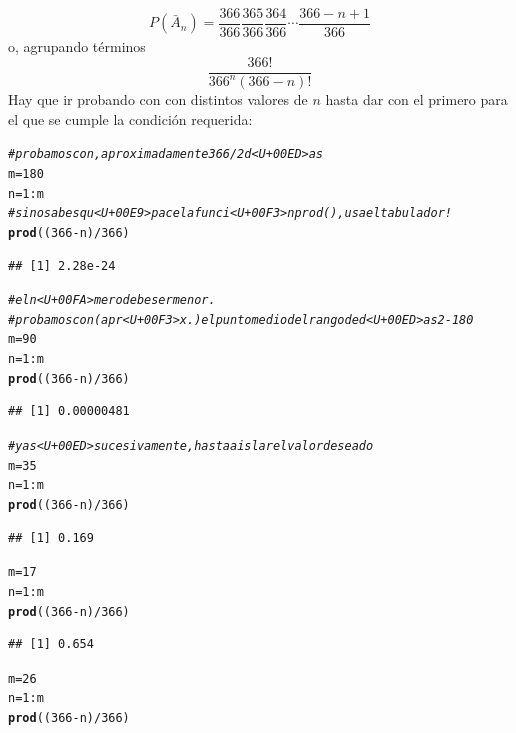 \documentclass[10pt,a4paper]{article}\usepackage[]{graphicx}\usepackage[]{color}
\makeatletter
\newcommand{\hlnum}[1]{\textcolor[rgb]{0.686,0.059,0.569}{#1}}%
\newcommand{\hlcom}[1]{\textcolor[rgb]{0.678,0.584,0.686}{\textit{#1}}}%
\newcommand{\hlopt}[1]{\textcolor[rgb]{0,0,0}{#1}}%
\newcommand{\hlstd}[1]{\textcolor[rgb]{0.345,0.345,0.345}{#1}}%
\newcommand{\hlkwb}[1]{\textcolor[rgb]{0.69,0.353,0.396}{#1}}%
\newcommand{\hlkwd}[1]{\textcolor[rgb]{0.737,0.353,0.396}{\textbf{#1}}}%
\newenvironment{kframe}{%
 \def\at@end@of@kframe{}%
 \ifinner\ifhmode%
  \def\at@end@of@kframe{\end{minipage}}%
  \begin{minipage}{\columnwidth}%
 \fi\fi%
 \def\FrameCommand##1{\hskip\@totalleftmargin \hskip-\fboxsep
 \colorbox{shadecolor}{##1}\hskip-\fboxsep
     \hskip-\linewidth \hskip-\@totalleftmargin \hskip\columnwidth}%
 \MakeFramed {\advance\hsize-\width
   \@totalleftmargin\z@ \linewidth\hsize
   \@setminipage}}%
 {\par\unskip\endMakeFramed%
 \at@end@of@kframe}
\newenvironment{knitrout}{}{} %
\makeatother
\begin{document}
$$ P(\bar A_n) =\dfrac{366}{366}\dfrac{365}{366}
\dfrac{364}{366}\cdots \dfrac{366-n+1}{366}$$
o, agrupando términos
$$\frac{366!}{366^n(366-n)!}$$
Hay que ir probando con con distintos valores de $n$ hasta dar con el primero para el que se cumple la condición requerida: 
\begin{knitrout}
\color{fgcolor}\begin{kframe}
\begin{alltt}
\hlcom{# probamos con, aproximadamente 366/2 d<U+00ED>as}
\hlstd{m} \hlkwb{=}\hlnum{180}
\hlstd{n} \hlkwb{=} \hlnum{1}\hlopt{:}\hlstd{m}
\hlcom{# si no sabes qu<U+00E9> pace la funci<U+00F3>n prod(), usa el tabulador!}
\hlkwd{prod}\hlstd{((}\hlnum{366}\hlopt{-}\hlstd{n)}\hlopt{/}\hlnum{366}\hlstd{)}
\end{alltt}
\begin{verbatim}
## [1] 2.28e-24
\end{verbatim}
\begin{alltt}
\hlcom{# eln<U+00FA>mero debe ser menor. }
\hlcom{# probamos con (apr<U+00F3>x.) el punto medio del rango de d<U+00ED>as 2-180}
\hlstd{m} \hlkwb{=}\hlnum{90}
\hlstd{n} \hlkwb{=} \hlnum{1}\hlopt{:}\hlstd{m}
\hlkwd{prod}\hlstd{((}\hlnum{366}\hlopt{-}\hlstd{n)}\hlopt{/}\hlnum{366}\hlstd{)}
\end{alltt}
\begin{verbatim}
## [1] 0.00000481
\end{verbatim}
\begin{alltt}
\hlcom{# y as<U+00ED> sucesivamente, hasta aislar el valor deseado}
\hlstd{m} \hlkwb{=}\hlnum{35}
\hlstd{n} \hlkwb{=} \hlnum{1}\hlopt{:}\hlstd{m}
\hlkwd{prod}\hlstd{((}\hlnum{366}\hlopt{-}\hlstd{n)}\hlopt{/}\hlnum{366}\hlstd{)}
\end{alltt}
\begin{verbatim}
## [1] 0.169
\end{verbatim}
\begin{alltt}
\hlstd{m} \hlkwb{=}\hlnum{17}
\hlstd{n} \hlkwb{=} \hlnum{1}\hlopt{:}\hlstd{m}
\hlkwd{prod}\hlstd{((}\hlnum{366}\hlopt{-}\hlstd{n)}\hlopt{/}\hlnum{366}\hlstd{)}
\end{alltt}
\begin{verbatim}
## [1] 0.654
\end{verbatim}
\begin{alltt}
\hlstd{m} \hlkwb{=}\hlnum{26}
\hlstd{n} \hlkwb{=} \hlnum{1}\hlopt{:}\hlstd{m}
\hlkwd{prod}\hlstd{((}\hlnum{366}\hlopt{-}\hlstd{n)}\hlopt{/}\hlnum{366}\hlstd{)}
\end{alltt}

\end{kframe}
\end{knitrout}
\end{document}
